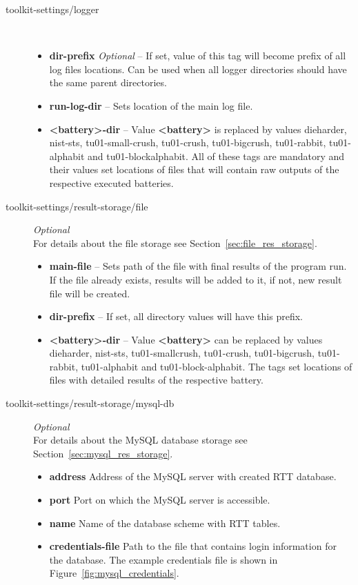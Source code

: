 \documentclass[
	digital,    %
	oneside,    %
	color,
	11pt,
	nocover,
	notable,
	nolof,
	nolot,
]{fithesis3}
\theoremstyle{definition}
\theoremstyle{remark}
\begin{document}
\begin{description}
\item[toolkit-settings/logger] \hfill \\
\begin{itemize}
\item \textbf{dir-prefix} \textit{Optional} -- If set, value of this tag will become prefix of all log files locations. Can be used when all logger directories should have the same parent directories.
\item \textbf{run-log-dir} -- Sets location of the main log file.
\item \textbf{<battery>-dir} -- Value \textbf{<battery>} is replaced by values dieharder, nist-sts, tu01-small-\linebreak crush, tu01-crush, tu01-bigcrush, tu01-rabbit, tu01-alphabit and tu01-blockalphabit. All of these tags are mandatory and their values set locations of files that will contain raw outputs of the respective executed batteries.
\end{itemize}

\item[toolkit-settings/result-storage/file] \textit{Optional} \hfill \\
For details about the file storage see Section~\ref{sec:file_res_storage}.
\begin{itemize}
\item \textbf{main-file} -- Sets path of the file with final results of the program run. If the file already exists, results will be added to it, if not, new result file will be created.
\item \textbf{dir-prefix} -- If set, all directory values will have this prefix.
\item \textbf{<battery>-dir} -- Value \textbf{<battery>} can be replaced by values dieharder, nist-sts, tu01-smallcrush, tu01-crush, tu01-bigcrush, tu01-rabbit, tu01-alphabit and tu01-block-\linebreak alphabit. The tags set locations of files with detailed results of the respective battery.
\end{itemize}

\item[toolkit-settings/result-storage/mysql-db] \textit{Optional} \hfill \\
For details about the MySQL database storage see Section~\ref{sec:mysql_res_storage}.
\begin{itemize}
\item \textbf{address} Address of the MySQL server with created RTT database.
\item \textbf{port} Port on which the MySQL server is accessible.
\item \textbf{name} Name of the database scheme with RTT tables.
\item \textbf{credentials-file} Path to the file that contains login information for the database. The example credentials file is shown in Figure~\ref{fig:mysql_credentials}.
\end{itemize}


\end{description}
\end{document}
